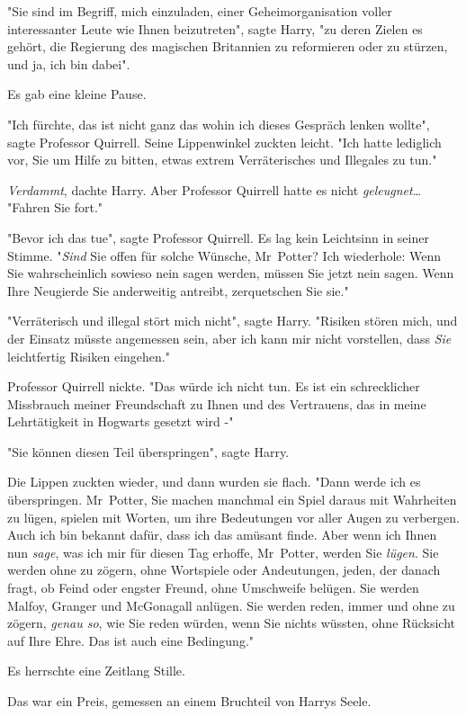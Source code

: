 {"Sie sind im Begriff, mich einzuladen, einer Geheimorganisation voller interessanter Leute wie Ihnen beizutreten", sagte Harry, "zu deren Zielen es gehört, die Regierung des magischen Britannien zu reformieren oder zu stürzen, und ja, ich bin dabei".

Es gab eine kleine Pause.

"Ich fürchte, das ist nicht ganz das wohin ich dieses Gespräch lenken wollte", sagte Professor Quirrell. Seine Lippenwinkel zuckten leicht. "Ich hatte lediglich vor, Sie um Hilfe zu bitten, etwas extrem Verräterisches und Illegales zu tun."

\emph{Verdammt}, dachte Harry. Aber Professor Quirrell hatte es nicht \emph{geleugnet}… "Fahren Sie fort."

"Bevor ich das tue", sagte Professor Quirrell. Es lag kein Leichtsinn in seiner Stimme. "\emph{Sind} Sie offen für solche Wünsche, Mr~Potter? Ich wiederhole: Wenn Sie wahrscheinlich sowieso nein sagen werden, müssen Sie jetzt nein sagen. Wenn Ihre Neugierde Sie anderweitig antreibt, zerquetschen Sie sie."

"Verräterisch und illegal stört mich nicht", sagte Harry. "Risiken stören mich, und der Einsatz müsste angemessen sein, aber ich kann mir nicht vorstellen, dass \emph{Sie} leichtfertig Risiken eingehen."

Professor Quirrell nickte. "Das würde ich nicht tun. Es ist ein schrecklicher Missbrauch meiner Freundschaft zu Ihnen und des Vertrauens, das in meine Lehrtätigkeit in Hogwarts gesetzt wird -"

"Sie können diesen Teil überspringen", sagte Harry.

Die Lippen zuckten wieder, und dann wurden sie flach. "Dann werde ich es überspringen. Mr~Potter, Sie machen manchmal ein Spiel daraus mit Wahrheiten zu lügen, spielen mit Worten, um ihre Bedeutungen vor aller Augen zu verbergen. Auch ich bin bekannt dafür, dass ich das amüsant finde. Aber wenn ich Ihnen nun \emph{sage}, was ich mir für diesen Tag erhoffe, Mr~Potter, werden Sie \emph{lügen}. Sie werden ohne zu zögern, ohne Wortspiele oder Andeutungen, jeden, der danach fragt, ob Feind oder engster Freund, ohne Umschweife belügen. Sie werden Malfoy, Granger und McGonagall anlügen. Sie werden reden, immer und ohne zu zögern, \emph{genau so}, wie Sie reden würden, wenn Sie nichts wüssten, ohne Rücksicht auf Ihre Ehre. Das ist auch eine Bedingung."

Es herrschte eine Zeitlang Stille.

Das war ein Preis, gemessen an einem Bruchteil von Harrys Seele.

}
